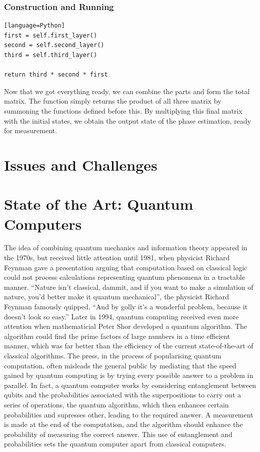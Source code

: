 \documentclass{article}
\begin{document}
\subsubsection{Construction and Running}

\begin{file}
\begin{lstlisting}[linewidth=14cm][language=Python]
first = self.first_layer()
second = self.second_layer()
third = self.third_layer()

return third * second * first
\end{lstlisting}
\end{file}
Now that we got everything ready, we can combine the parts and form the total matrix. The function simply returns the product of all three matrix by summoning the functions defined before this. By multiplying this final matrix with the initial states, we obtain the output state of the phase estimation, ready for measurement.

\pagebreak

\section{Issues and Challenges}

\pagebreak
\section{State of the Art: Quantum Computers}

\noindent
The idea of combining quantum mechanics and information theory appeared in the 1970s, but received little attention until 1981, when physicist Richard Feynman gave a presentation arguing that computation based on classical logic could not process calculations representing quantum phenomena in a tractable manner. %
“Nature isn’t classical, dammit, and if you want to make a simulation of nature, you’d better make it
quantum mechanical”, the physicist Richard Feynman famously quipped. “And by golly it’s a
wonderful problem, because it doesn’t look so easy.” %
Later in 1994, quantum computing received even more attention when mathematicial Peter Shor developed a quantum algorithm. The algorithm could find the prime factors of large numbers in a time efficient manner, which was far better than the efficiency of the current state-of-the-art of classical algorithms. The press, in the process of popularising quantum computation, often misleads the general public by mediating that the speed gained by quantum computing is by trying every possible  answer to a problem in parallel. In fact, a quantum computer works by considering entanglement between qubits and the probabilities associated with the superpositions to carry out a series of operations, the quantum algorithm, which then enhances certain probabilities and supresses other, leading to the required answer. A measurement is made at the end of the computation, and the algorithm should enhance the probability of measuring the correct answer. This use of entanglement and probabilities sets the quantum computer apart from classical computers. 
\end{document}

